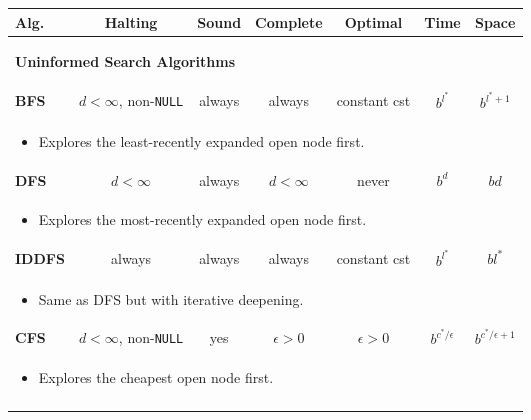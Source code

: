 
\begin{summary}
    \begin{center}
        \begin{tabular}{lcccccc}
        \toprule
        \textbf{Alg.} & Halting & Sound & Complete & Optimal & Time & Space \\
        \midrule
        \multicolumn{7}{p{\linewidth}}{
        \begin{center}
            \textbf{Uninformed Search Algorithms}
        \end{center}} \\
        \midrule
        \textbf{BFS} & $d<\infty$, non-\texttt{NULL} & always & always & constant cst & $b^{l^{*}}$ & $b^{l^{*} + 1}$ \\
        \multicolumn{7}{p{\linewidth}}{
        \begin{itemize}
            \item Explores the least-recently expanded open node first.
        \end{itemize}} \\
        \midrule
        \textbf{DFS} & $d<\infty$ & always & $d < \infty$ & never & $b^{d}$ & $bd$ \\
        \multicolumn{7}{p{\linewidth}}{
        \begin{itemize}
            \item Explores the most-recently expanded open node first.
        \end{itemize}} \\
        \midrule
        \textbf{IDDFS} & always & always & always & constant cst & $b^{l^{*}}$ & $bl^{*}$ \\
        \multicolumn{7}{p{\linewidth}}{
        \begin{itemize}
            \item Same as DFS but with iterative deepening.
        \end{itemize}} \\
        \midrule
        \textbf{CFS} & $d<\infty$, non-\texttt{NULL} & yes & $\epsilon >0$ & $\epsilon >0$ & $b^{c^{*} / \epsilon}$ & $b^{c^{*}/\epsilon + 1}$ \\
        \multicolumn{7}{p{\linewidth}}{
        \begin{itemize}
            \item Explores the cheapest open node first.
        \end{itemize}} \\
        \midrule
        \multicolumn{7}{p{\linewidth}}{
        \begin{center}

\end{center}}
\end{tabular}
\end{center}
\end{summary}

